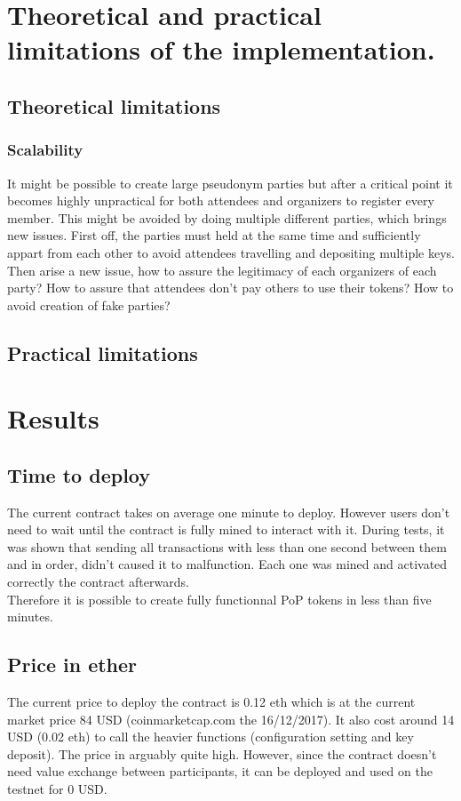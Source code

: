 \documentclass[11pt, a4paper, twoside, openright]{book} %
\begin{document}
\section{Theoretical and practical limitations of the implementation.}
\subsection{Theoretical limitations}
\subsubsection*{Scalability}
It might be possible to create large pseudonym parties but after a critical point it becomes highly unpractical for both attendees and organizers to register every member. This might be avoided by doing multiple different parties, which brings new issues. First off, the parties must held at the same time and sufficiently appart from each other to avoid attendees travelling and depositing multiple keys. Then arise a new issue, how to assure the legitimacy of each organizers of each party? How to assure that attendees don't pay others to use their tokens? How to avoid creation of fake parties? 


\subsection{Practical limitations}
\section{Results}
\subsection{Time to deploy}
The current contract takes on average one minute to deploy. However users don't need to wait until the contract is fully mined to interact with it. During tests, it was shown that sending all transactions with less than one second between them and in order, didn't caused it to malfunction. Each one was mined and activated correctly the contract afterwards. \\
Therefore it is possible to create fully functionnal PoP tokens in less than five minutes. 
\subsection{Price in ether}
The current price to deploy the contract is 0.12 eth which is at the current market price 84 USD (coinmarketcap.com the 16/12/2017). It also cost around 14 USD (0.02 eth) to call the heavier functions (configuration setting and key deposit). The price in arguably quite high. However, since the contract doesn't need value exchange between participants, it can be deployed and used on the testnet for 0 USD.
\end{document}
